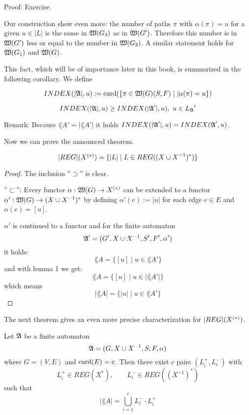 Proof: Exercise.

Our construction show even more: the number of paths $\pi$ with $\alpha(\pi) =
u$ for a given $u \in |L|$ is the same in $\mbox{$\mathfrak{W}(G_3)$}$ as in $\mbox{$\mathfrak{W}(G')$}$.
Therefore this number is in $\mbox{$\mathfrak{W}(G')$}$ less or equal to the number in
$\mbox{$\mathfrak{W}(G_2)$}$. A similar statement holds for $\mbox{$\mathfrak{W}(G_1)$}$ and
$\mbox{$\mathfrak{W}(G)$}$.

This fact, which will be of importance later in this book, is summarized in the
following corollary. We define

\begin{definition}
\[ INDEX(|\mbox{$\mathfrak{A}$}|, u) := \mathrm{card}(\mbox{$\{\pi \in \mbox{$\mathfrak{W}(G)$}(S, F) \mid
|\alpha(\pi) = u\}$}) \]
\end{definition}

\begin{corollary}
\[ INDEX(|\mbox{$\mathfrak{A}$}|, u) \geq INDEX(|\mbox{$\mathfrak{A}$}'|, u),\ u \in \mbox{$L_{\mathfrak{A}}$}' \]
\end{corollary}

Remark: Because $\lang{A}' = |\lang{A}'|$ it holds $INDEX(|\mbox{$\mathfrak{A}$}'|, u) =
INDEX(\mbox{$\mathfrak{A}$}', u)$.

Now we can prove the announced theorem.

\begin{theorem}
\[ |REG|(\mbox{${X}^{(*)}$}) = \{ |L| \mid L \in REG((X\cup X^{-1})^*) \} \]
\end{theorem}

\begin{proof}
 The inclusion ''$\supset$'' is clear.
 
 ''$\subset$'': Every functor $\alpha : \mbox{$\mathfrak{W}(G)$} \to \mbox{${X}^{(*)}$}$ can be
 extended to a functor $\alpha' : \mbox{$\mathfrak{W}(G)$} \to (X \cup X^{-1})^*$ by
 defining $\alpha'(e) := |u|$ for each edge $e \in E$ and $\alpha(e) = [u]$.
 
 $\alpha'$ is continued to a functor and for the finite automaton
 \[ \mbox{$\mathfrak{A}$}' = (G', X \cup X^{-1}, S', F', \alpha') \]
 it holds:
 \[ \lang{A} = \{ [u] \mid u \in \lang{A}' \} \]
 and with lemma 1 we get:
 \[ \lang{A} = \{ [u] \mid u \in |\lang{A}'| \} \]
 which means
 \[ |\lang{A}| = \{ |u| \mid u \in \lang{A}' \} \]
\end{proof}

The next theorem gives an even more precise characterization for
$|REG|(\mbox{${X}^{(*)}$})$.

\begin{theorem}
Let $\mbox{$\mathfrak{A}$}$ be a finite automaton
\[ \mbox{$\mathfrak{A}$} = (G, X \cup X^{-1}, S, F, \alpha) \]
where $G = (V, E)$ and $\mathrm{card}(E) = c$. Then there exist $c$ pairs $(L_i^+,
L_i^-)$ with 
\[ L_i^+ \in REG(X^*),\qquad L_i^- \in REG((X^{-1})^*) \]
such that
\[ |\lang{A}| = \bigcup_{i=1}^c L_i^- \cdot L_i^+ \]
\end{theorem}

